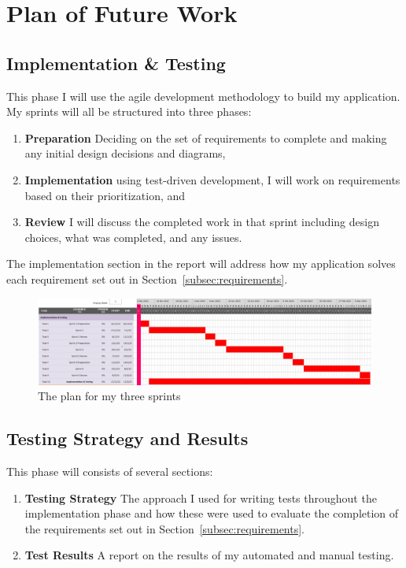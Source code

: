 \section{Plan of Future Work}

\subsection*{Implementation \& Testing}
This phase I will use the agile development methodology to build my application. My sprints will all be structured into three phases:

\begin{enumerate}
  \item \textbf{Preparation} Deciding on the set of requirements to complete and making any initial design decisions and diagrams,
  \item \textbf{Implementation} using test-driven development, I will work on requirements based on their prioritization, and
  \item \textbf{Review} I will discuss the completed work in that sprint including design choices, what was completed, and any issues.  
\end{enumerate}

The implementation section in the report will address how my application solves each requirement set out in Section~\ref{subsec:requirements}.

\begin{figure}[ht]
  \centering
  \includegraphics[width=\textwidth]{assets/images/charts/gantt/implementation-testing.png}
  \caption{The plan for my three sprints}
\end{figure}

\subsection*{Testing Strategy and Results}
This phase will consists of several sections:

\begin{enumerate}
  \item \textbf{Testing Strategy} The approach I used for writing tests throughout the implementation phase and how these were used to evaluate the completion of the requirements set out in Section~\ref{subsec:requirements}. 
  \item \textbf{Test Results} A report on the results of my automated and manual testing.
\end{enumerate}

